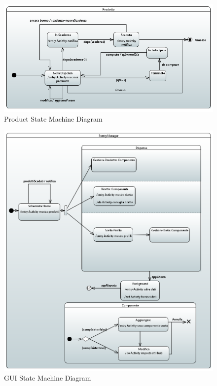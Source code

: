 \documentclass{article}
\begin{document}
\begin{figure}[H]
    \centering
    \includegraphics[width=\linewidth]{imgs/ProdottoSttMchnDgrm.png}
    \caption{Product State Machine Diagram}
    \label{fig:enter-label}
\end{figure}
\begin{figure}[H]
    \centering
    \includegraphics[width=\linewidth]{imgs/GuiStateMachineDiagram_0.1.0.png}
    \caption{GUI State Machine Diagram}
    \label{fig:enter-label}
\end{figure}
\end{document}
